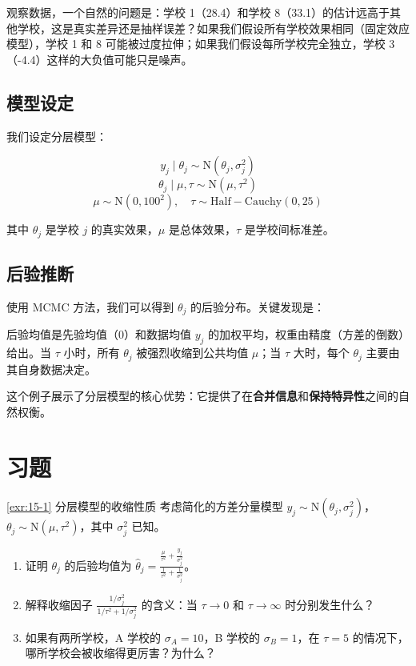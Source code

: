 观察数据，一个自然的问题是：学校 1（28.4）和学校 8（33.1）的估计远高于其他学校，这是真实差异还是抽样误差？如果我们假设所有学校效果相同（固定效应模型），学校 1 和 8 可能被过度拉伸；如果我们假设每所学校完全独立，学校 3（-4.4）这样的大负值可能只是噪声。

\subsection{模型设定}
\label{sec:coaching-model}

我们设定分层模型：

\[
y_j \mid \theta_j \sim \mathrm{N}(\theta_j, \sigma_j^2)
\]
\[
\theta_j \mid \mu, \tau \sim \mathrm{N}(\mu, \tau^2)
\]
\[
\mu \sim \mathrm{N}(0, 100^2), \quad \tau \sim \mathrm{Half-Cauchy}(0, 25)
\]

其中 $\theta_j$ 是学校 $j$ 的真实效果，$\mu$ 是总体效果，$\tau$ 是学校间标准差。

\subsection{后验推断}
\label{sec:coaching-posterior}

使用 MCMC 方法，我们可以得到 $\theta_j$ 的后验分布。关键发现是：

\begin{Remark}
后验均值是先验均值（0）和数据均值 $y_j$ 的加权平均，权重由精度（方差的倒数）给出。当 $\tau$ 小时，所有 $\theta_j$ 被强烈收缩到公共均值 $\mu$；当 $\tau$ 大时，每个 $\theta_j$ 主要由其自身数据决定。
\end{Remark}

这个例子展示了分层模型的核心优势：它提供了在\textbf{合并信息}和\textbf{保持特异性}之间的自然权衡。

\section{习题}
\label{sec:chapter15-exercises}

\begin{Exercise}{\ref{exr:15-1} 分层模型的收缩性质}
\label{exr:15-1}
考虑简化的方差分量模型 $y_j \sim \mathrm{N}(\theta_j, \sigma_j^2)$，$\theta_j \sim \mathrm{N}(\mu, \tau^2)$，其中 $\sigma_j^2$ 已知。

\begin{enumerate}
  \item 证明 $\theta_j$ 的后验均值为 $\widehat{\theta}_j = \frac{\frac{\mu}{\tau^2} + \frac{y_j}{\sigma_j^2}}{\frac{1}{\tau^2} + \frac{1}{\sigma_j^2}}$。
  \item 解释收缩因子 $\frac{1/\sigma_j^2}{1/\tau^2 + 1/\sigma_j^2}$ 的含义：当 $\tau \to 0$ 和 $\tau \to \infty$ 时分别发生什么？
  \item 如果有两所学校，A 学校的 $\sigma_A = 10$，B 学校的 $\sigma_B = 1$，在 $\tau = 5$ 的情况下，哪所学校会被收缩得更厉害？为什么？
\end{enumerate}
\end{Exercise}

